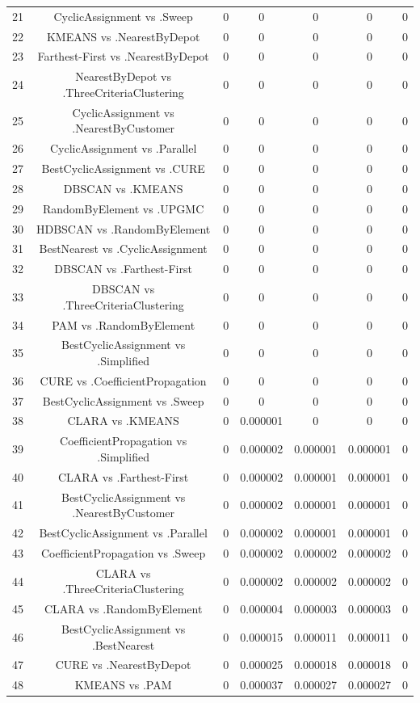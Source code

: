\documentclass[a4paper,10pt]{article}
\begin{document}
\begin{landscape}
\begin{table}[!htp]
\begin{tabular}{ccccccc}
21&CyclicAssignment vs .Sweep&0&0&0&0&0\\
22&KMEANS vs .NearestByDepot&0&0&0&0&0\\
23&Farthest-First vs .NearestByDepot&0&0&0&0&0\\
24&NearestByDepot vs .ThreeCriteriaClustering&0&0&0&0&0\\
25&CyclicAssignment vs .NearestByCustomer&0&0&0&0&0\\
26&CyclicAssignment vs .Parallel&0&0&0&0&0\\
27&BestCyclicAssignment vs .CURE&0&0&0&0&0\\
28&DBSCAN vs .KMEANS&0&0&0&0&0\\
29&RandomByElement vs .UPGMC&0&0&0&0&0\\
30&HDBSCAN vs .RandomByElement&0&0&0&0&0\\
31&BestNearest vs .CyclicAssignment&0&0&0&0&0\\
32&DBSCAN vs .Farthest-First&0&0&0&0&0\\
33&DBSCAN vs .ThreeCriteriaClustering&0&0&0&0&0\\
34&PAM vs .RandomByElement&0&0&0&0&0\\
35&BestCyclicAssignment vs .Simplified&0&0&0&0&0\\
36&CURE vs .CoefficientPropagation&0&0&0&0&0\\
37&BestCyclicAssignment vs .Sweep&0&0&0&0&0\\
38&CLARA vs .KMEANS&0&0.000001&0&0&0\\
39&CoefficientPropagation vs .Simplified&0&0.000002&0.000001&0.000001&0\\
40&CLARA vs .Farthest-First&0&0.000002&0.000001&0.000001&0\\
41&BestCyclicAssignment vs .NearestByCustomer&0&0.000002&0.000001&0.000001&0\\
42&BestCyclicAssignment vs .Parallel&0&0.000002&0.000001&0.000001&0\\
43&CoefficientPropagation vs .Sweep&0&0.000002&0.000002&0.000002&0\\
44&CLARA vs .ThreeCriteriaClustering&0&0.000002&0.000002&0.000002&0\\
45&CLARA vs .RandomByElement&0&0.000004&0.000003&0.000003&0\\
46&BestCyclicAssignment vs .BestNearest&0&0.000015&0.000011&0.000011&0\\
47&CURE vs .NearestByDepot&0&0.000025&0.000018&0.000018&0\\
48&KMEANS vs .PAM&0&0.000037&0.000027&0.000027&0\\

\end{tabular}
\end{table}
\end{landscape}
\end{document}
